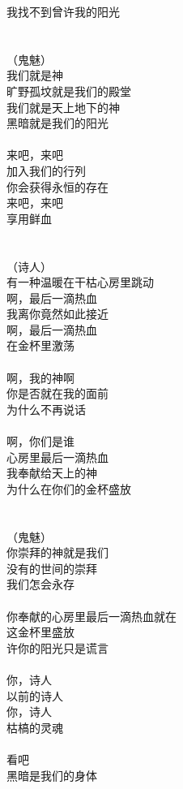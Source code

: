我找不到曾许我的阳光\\
\\
\\
（鬼魅）\\
我们就是神\\
旷野孤坟就是我们的殿堂\\
我们就是天上地下的神\\
黑暗就是我们的阳光\\
\\
来吧，来吧\\
加入我们的行列\\
你会获得永恒的存在\\
来吧，来吧\\
享用鲜血\\
\\
\\
（诗人）\\
有一种温暖在干枯心房里跳动\\
啊，最后一滴热血\\
我离你竟然如此接近\\
啊，最后一滴热血\\
在金杯里激荡\\
\\
啊，我的神啊\\
你是否就在我的面前\\
为什么不再说话\\
\\
啊，你们是谁\\
心房里最后一滴热血\\
我奉献给天上的神\\
为什么在你们的金杯盛放\\
\\
\\
（鬼魅）\\
你崇拜的神就是我们\\
没有的世间的崇拜\\
我们怎会永存\\
\\
你奉献的心房里最后一滴热血就在\\
这金杯里盛放\\
许你的阳光只是谎言\\
\\
你，诗人\\
以前的诗人\\
你，诗人\\
枯槁的灵魂\\
\\
看吧\\
黑暗是我们的身体\\
